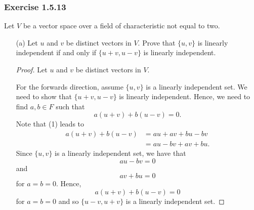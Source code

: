 \subsubsection{Exercise 1.5.13} Let \( V  \) be a vector space over a field of characteristic not equal to two.
\begin{enumerate}
    \item[(a)] Let \( u  \) and \( v  \) be distinct vectors in \( V  \). Prove that \( \{ u,v  \}   \) is linearly independent if and only if \( \{ u + v , u - v  \}   \) is linearly independent.
        \begin{proof}
        Let \( u \) and \( v  \) be distinct vectors in \( V  \). 

        For the forwards direction, assume \( \{ u,v  \}   \) is a linearly independent set. We need to show that \( \{ u + v , u - v  \}  \) is linearly independent. Hence, we need to find \( a,b \in F  \) such that 
        \[  a(u+v) + b(u-v) = 0. \tag{1} \]
        Note that (1) leads to 
        \begin{align*}
            a(u+v) + b(u-v) &= au + av + bu - bv \\
                            &= au - bv + av + bu. 
        \end{align*}
        Since \( \{ u,v  \}   \) is a linearly independent set, we have that 
        \[  au - bv = 0  \]
        and 
        \[  av + bu = 0  \] for \( a=b = 0 \). Hence, 
        \[  a(u+v) + b(u-v) = 0  \] for \( a = b = 0  \) and so \( \{ u - v , u + v  \}   \) is a linearly independent set.


\end{proof}
\end{enumerate}
